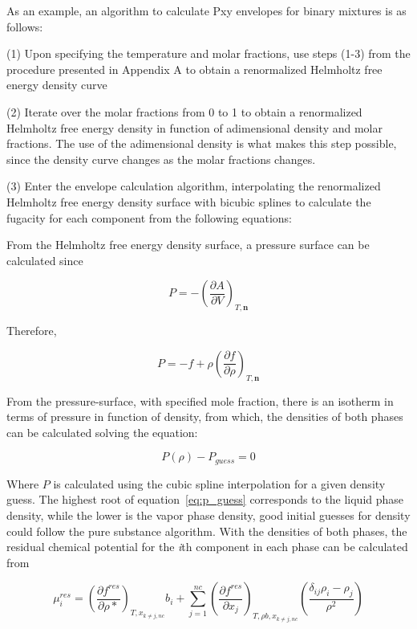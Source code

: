 \documentclass[preprint,12pt,3p]{elsarticle}
\begin{document}
\begin{appendices}
	As an example, an algorithm to calculate Pxy envelopes for binary mixtures is as follows:
	
	(1) Upon specifying the temperature and molar fractions, use steps (1-3) from the procedure presented in Appendix A to obtain a renormalized Helmholtz free energy density curve
	
	(2) Iterate over the molar fractions from 0 to 1 to obtain a renormalized Helmholtz free energy density in function of adimensional density and molar fractions. The use of the adimensional density is what makes this step possible, since the density curve changes as the molar fractions changes.
	
	(3) Enter the envelope calculation algorithm, interpolating the renormalized Helmholtz free energy density surface with bicubic splines to calculate the fugacity for each component from the following equations:
	
	From the Helmholtz free energy density surface, a pressure surface can be calculated since
	
\begin{equation} \label{eq:press_helm_deriv}
	P = -\left(\frac{\partial A}{\partial V}\right)_{T,\textbf{n}}
\end{equation}

	Therefore,

\begin{equation} \label{eq:press_helm_deriv2}
	P = -f+\rho\left(\frac{\partial f}{\partial \rho}\right)_{T,\textbf{n}}
\end{equation}

	From the pressure-surface, with specified mole fraction, there is an isotherm in terms of pressure in function of density, from which, the densities of both phases can be calculated solving the equation:
	
\begin{equation} \label{eq:p_guess}
	P(\rho) - P_{guess} = 0
\end{equation}	
	
	Where $P$ is calculated using the cubic spline interpolation for a given density guess. The highest root of equation~\ref{eq:p_guess} corresponds to the liquid phase density, while the lower is the vapor phase density, good initial guesses for density could follow the pure substance algorithm. With the densities of both phases, the residual chemical potential for the \textit{i}th component in each phase can be calculated from
	
\begin{equation} \label{eq:chem_pot_i}
	\mu_{i}^{res} = \left(\frac{\partial f^{res}}{\partial \rho{*}}\right)_{T,x_{k\neq j,nc}}b_{i}+\sum_{j=1}^{nc} \left(\frac{\partial f^{res}}{\partial x_{j}}\right)_{T,\rho b,x_{k\neq j,nc}} \left(\frac{\delta_{ij} \rho_{i}-\rho_{j}}{\rho^{2}}\right)
\end{equation} 


\end{appendices}
\end{document}
